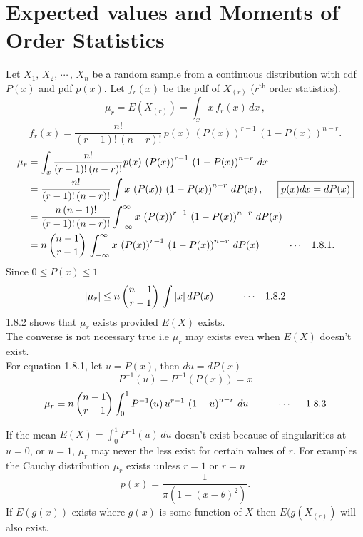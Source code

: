 \documentclass[12pt,a4paper]{report}
\theoremstyle{definition}
\theoremstyle{plain}
\begin{document}
\section{Expected values and Moments of Order Statistics}
Let $X_1, \, X_2, \, \cdots\, , \, X_n$ be a random sample from a continuous distribution with cdf $P(x)$ and pdf $p(x)$. Let $f_r(x)$ be the pdf of $X_{(r)}$ ($r^{\text{th}}$ order statistics). 
$$\mu_r = E\left(X_{(r)}\right) = \int_x x\, f_r(x)\, dx\,, $$
$$f_r(x) = \frac{n!}{(r - 1)!\, (n - r)!}\, p(x)\, \left(P(x)\right)^{r - 1}\, \left(1 - P(x)\right)^{n - r}.$$
\begin{align*}
\mu_r & = \int_x \frac{n!}{(r - 1)!\, (n - r)!}p(x)\, \left(P(x)\right)^{r - 1}\, \left(1 - P(x)\right)^{n - r } \, dx\\
& = \frac{n!}{(r - 1)!\, (n - r)!}\int x\, \left(P(x)\right)\, \left(1 - P(x)\right)^{n - r}\, dP(x)\, , \hspace{0.5cm} \boxed{p(x)dx = dP(x)}\\
& = \frac{n\, (n - 1)!}{(r - 1)!\, (n - r)!}\int^{\infty}_{-\infty} x\, \left(P(x)\right)^{r - 1}\, \left(1 - P(x)\right)^{n - r}\, dP(x)\\
& = n\, \binom{n - 1}{r  - 1}\, \int^{\infty}_{-\infty} x\, \left(P(x)\right)^{r - 1}\, \left(1 - P(x)\right)^{n - r}\, dP(x)\hspace{1cm} \cdots\hspace{0.3cm} 1.8.1.
\end{align*}
Since  $0 \leq P(x) \leq 1$
$$|\mu_r| \leq n \, \binom{n - 1}{r - 1}\, \int |x|\, dP(x)\hspace{1cm} \cdots\hspace{0.3cm} 1.8.2$$
1.8.2 shows that $\mu_r$ exists provided $E(X)$ exists.\\

The converse is not necessary true i.e $\mu_r$ may exists even when $E(X)$ doesn't exist.\\

For equation 1.8.1, let $u = P(x)$, then $du = dP(x)$
$$P^{-1}(u) = P^{-1}\left(P(x)\right) = x$$
$$\mu_r = n\, \binom{n - 1}{r - 1}\int_0^1P^{-1}(u)\, u^{r - 1}\, \left(1 - u\right)^{n - r}\, du\hspace{1cm} \cdots\hspace{0.5cm} 1.8.3$$

If the mean $E(X) = \int^1_0P^{-1}(u)\, du$ doesn't exist because of singularities at $u = 0$, or $u = 1$, $\mu_r$ may never the less exist for certain values of $r$. For examples the Cauchy distribution $\mu_r$ exists unless $r = 1$ or $r = n$ 
$$p(x) = \frac{1}{\pi\left(1 + (x - \theta)^2\right)}.$$
If $E(g(x))$ exists where $g(x)$ is some function of $X$ then $E(g(X_{(r)})$ will also exist.\\
\end{document}
